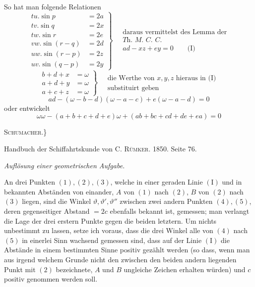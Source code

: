 %
\par
So hat man folgende Relationen
\[
\left.\begin{aligned}
tu.\sin p&=2a\\ tv.\sin q&=2x\\ tw.\sin r&=2e\\
vw.\sin(r-q)&=2d\\ uw.\sin(r-p)&=2z\\ uv.\sin(q-p)&=2y
\end{aligned}\right\}\quad
\begin{gathered}\text{daraus vermittelst des Lemma der}\\
\textit{Th. M. C. C.}\\ ad-xz+ey=0\qquad\text{(I)}\end{gathered}
\]
\[
\left.\begin{aligned}b+d+x&=\omega\\a+d+y&=\omega\\a+c+z&=\omega\end{aligned}\right\}\quad
\begin{gathered}\text{die Werthe von }x,y,z\text{ hieraus in (I)}\\\text{substituirt geben}\end{gathered}
\]
\[ad-(\omega-b-d)(\omega-a-c)+e(\omega-a-d)=0\]
oder entwickelt
\[\omega\omega-(a+b+c+d+e)\omega+(ab+bc+cd+de+ea)=0\]
\begin{flushright}\textsc{Schumacher}.\}\end{flushright}
\par\bigskip{}
\begin{center}Handbuch der Schiffahrtskunde von C. \textsc{Rümker}. 1850. Seite 76.\par\medskip
\textit{Auflösung einer geometrischen Aufgabe.}\end{center}
\hspace*{\parindent}An drei Punkten \((1),(2),(3)\), welche in einer geraden Linie \(\mathrm{(I)}\) und in bekannten Abständen von einander, \(A\) von \((1)\) nach \((2)\), \(B\) von \((2)\) nach \((3)\) liegen, sind die Winkel \(\vartheta,\vartheta',\vartheta''\) zwischen zwei andern Punkten \((4),(5)\), deren gegenseitiger Abstand \(=2c\) ebenfalls bekannt ist, gemessen; man verlangt die Lage der drei erstern Punkte gegen die beiden letztern. Um nichts unbestimmt zu lassen, setze ich voraus, dass die drei Winkel alle von \((4)\) nach \((5)\) in einerlei Sinn wachsend gemessen sind, dass auf der Linie \(\mathrm{(I)}\) die Abstände in einem bestimmten Sinne positiv gezählt werden (so dass, wenn man aus irgend welchem Grunde nicht den zwischen den beiden andern liegenden Punkt mit \((2)\) bezeichnete, \(A\) und \(B\) ungleiche Zeichen erhalten würden) und \(c\) positiv genommen werden soll.
